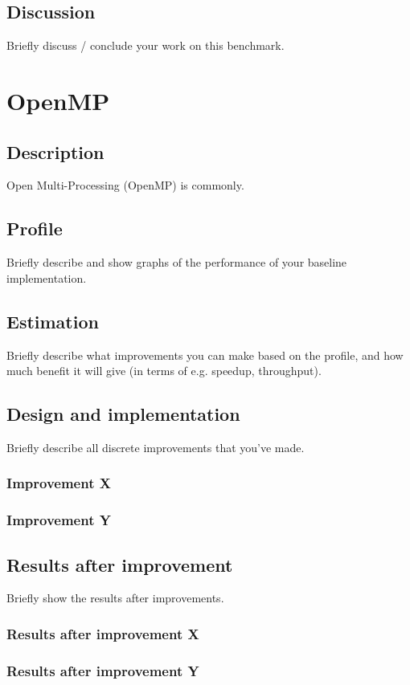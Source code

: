 \documentclass[twocolumn]{article}
\begin{document}
\subsection{Discussion}
Briefly discuss / conclude your work on this benchmark.

\section{OpenMP}
\subsection{Description}
Open Multi-Processing (OpenMP) is commonly. 
\subsection{Profile}
Briefly describe and show graphs of the performance of your baseline implementation.
\subsection{Estimation}
Briefly describe what improvements you can make based on the profile, and how much benefit it will give (in terms of e.g. speedup, throughput).
\subsection{Design and implementation}
Briefly describe all discrete improvements that you've made.
\subsubsection{Improvement X}
\subsubsection{Improvement Y}
\subsection{Results after improvement}
Briefly show the results after improvements.
\subsubsection{Results after improvement X}
\subsubsection{Results after improvement Y}
\end{document}
